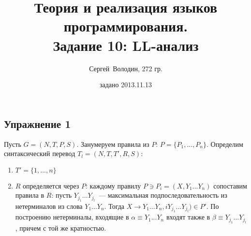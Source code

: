 \documentclass[a4paper]{article}
\title{Теория и реализация языков программирования.\\Задание 10: LL-анализ}
\date{задано 2013.11.13}
\author{Сергей~Володин, 272 гр.}
\begin{document}
\maketitle
\subsection*{Упражнение 1}
Пусть $G=(N,T,P,S)$. Занумеруем правила из $P$: $P=\{P_1,...,P_n\}$.\newline
Определим синтаксический перевод $T_l=(N, T, T', R, S)$:\begin{enumerate}
\item $T'=\{1,...,n\}$
\item $R$ определяется через $P$: каждому правилу $P\ni P_i=(X,Y_1...Y_n)$ сопоставим правила в $R$: пусть $Y_{j_1}...Y_{j_l}$~--- максимальная подпоследовательность из нетерминалов из слова $Y_1...Y_n$. Тогда $X\longrightarrow Y_1...Y_n,iY_{j_1}...Y_{j_l})\in P'$.\newline
По построению нетерминалы, входящие в $\alpha\equiv Y_1...Y_n$ входят также в $\beta\equiv Y_{j_1}...Y_{j_l}$, причем с той же кратностью.
\end{enumerate}
\end{document}

